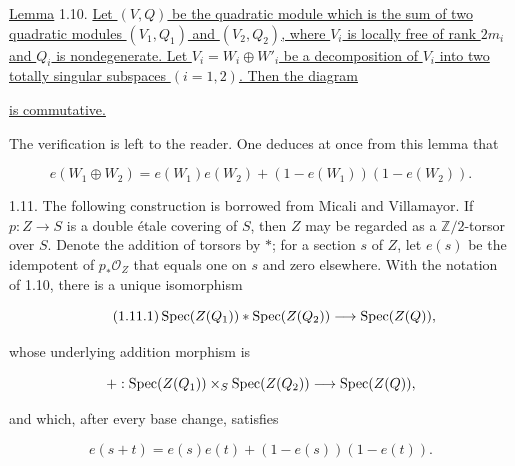 \underline{Lemma} 1.10. \underline{Let $(V,Q)$ be the quadratic module
which is the sum of two quadratic modules $(V_1,Q_1)$ and $(V_2,Q_2)$,
where $V_i$ is locally free of rank $2m_i$ and $Q_i$ is nondegenerate.
Let $V_i=W_i\oplus W'_i$ be a decomposition of $V_i$ into two totally
singular subspaces $(i=1,2)$.  Then the diagram}

\begin{center}
\end{center}

\underline{is commutative.}


The verification is left to the reader.  One deduces at once from this
lemma that

\begin{equation}\tag{1.10.1}
e(W_1\oplus W_2)
=e(W_1)e(W_2)+(1-e(W_1))(1-e(W_2)).
\end{equation}

1.11. The following construction is borrowed from Micali and Villamayor.
If $p:Z\longrightarrow S$ is a double étale covering of $S$, then $Z$ may
be regarded as a $\mathbb Z/2$-torsor over $S$.  Denote the addition of
torsors by $*$; for a section $s$ of $Z$, let $e(s)$ be the idempotent of
$p_*\mathcal O_Z$ that equals one on $s$ and zero elsewhere.  With the
notation of 1.10, there is a unique isomorphism

\begin{equation}\tag{1.11.1}
\operatorname{Spec}(Z(Q_1))*\operatorname{Spec}(Z(Q_2))\longrightarrow\operatorname{Spec}(Z(Q)),
\end{equation}

whose underlying addition morphism is

\begin{equation*}
+:\operatorname{Spec}(Z(Q_1))\times_S\operatorname{Spec}(Z(Q_2))
\longrightarrow\operatorname{Spec}(Z(Q)),
\end{equation*}

and which, after every base change, satisfies

\begin{equation*}
e(s+t)=e(s)e(t)+(1-e(s))(1-e(t)).
\end{equation*}

